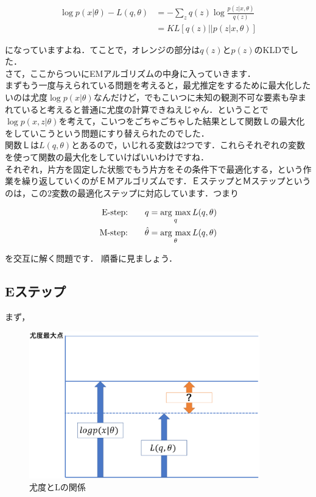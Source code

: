 \documentclass[11pt,a4paper,dvipdfmx]{ujreport}
\newcommand{\argmax}{\mathop{\rm arg~max}\limits}
\begin{document}
\begin{align}
  \log p(x|\theta) - L(q,\theta)&= -\sum_z q(z) \log \frac{p(z|x,\theta)}{q(z)}\nonumber\\
  &= KL[q(z)||p(z|x,\theta)]\nonumber
\end{align}

になっていますよね．てことで，オレンジの部分は$q(z)$と$p(z)$のKLDでした．\\

さて，ここからついにEMアルゴリズムの中身に入っていきます．\\

まずもう一度与えられている問題を考えると，最尤推定をするために最大化したいのは尤度$\log p(x|\theta)$なんだけど，でもこいつに未知の観測不可な要素も孕まれていると考えると普通に尤度の計算できねえじゃん．ということで$\log p(x,z|\theta)$を考えて，こいつをごちゃごちゃした結果として関数Ｌの最大化をしていこうという問題にすり替えられたのでした．\\

関数Ｌは$L(q,\theta)$とあるので，いじれる変数は2つです．これらそれぞれの変数を使って関数の最大化をしていけばいいわけですね．\\

それぞれ，片方を固定した状態でもう片方をその条件下で最適化する，という作業を繰り返していくのがＥＭアルゴリズムです．ＥステップとＭステップというのは，この2変数の最適化ステップに対応しています．つまり

\begin{align}
  \text{E-step:} \qquad q &= \argmax_{q}L(q,\theta)\nonumber\\
  \text{M-step:} \qquad \hat{\theta} &= \argmax_{\theta}L(q,\theta)\nonumber
\end{align}

を交互に解く問題です．
順番に見ましょう．\\

\subsection{Eステップ}

まず，
\begin{figure}[H]
  \centering
  \includegraphics[width=10cm]{../figures/em1.eps}
  \caption{尤度とLの関係}
\end{figure}
\end{document}
